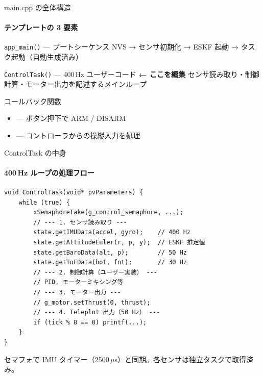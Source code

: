 \documentclass[aspectratio=169, 14pt]{beamer}
\begin{document}
\begin{frame}{main.cpp の全体構造}
  \framesubtitle{テンプレートの 3 要素}

  \begin{block}{\texttt{app\_main()} — ブートシーケンス}
    {\small NVS → センサ初期化 → ESKF 起動 → タスク起動（自動生成済み）}
  \end{block}

  \vspace{0.3em}

  \begin{alertblock}{\texttt{ControlTask()} — 400\,Hz ユーザーコード \textbf{← ここを編集}}
    {\small センサ読み取り・制御計算・モーター出力を記述するメインループ}
  \end{alertblock}

  \vspace{0.3em}

  \begin{exampleblock}{コールバック関数}
    {\small
    \begin{itemize}
      \item {} — ボタン押下で ARM / DISARM
      \item {} — コントローラからの操縦入力を処理
    \end{itemize}
    }
  \end{exampleblock}
\end{frame}

\begin{frame}[fragile]{ControlTask の中身}
  \framesubtitle{400\,Hz ループの処理フロー}
  \begin{lstlisting}[style=sfcpp, basicstyle=\ttfamily\scriptsize]
void ControlTask(void* pvParameters) {
    while (true) {
        xSemaphoreTake(g_control_semaphore, ...);
        // --- 1. センサ読み取り ---
        state.getIMUData(accel, gyro);    // 400 Hz
        state.getAttitudeEuler(r, p, y);  // ESKF 推定値
        state.getBaroData(alt, p);        // 50 Hz
        state.getToFData(bot, fnt);       // 30 Hz
        // --- 2. 制御計算（ユーザー実装） ---
        // PID, モーターミキシング等
        // --- 3. モーター出力 ---
        // g_motor.setThrust(0, thrust);
        // --- 4. Teleplot 出力（50 Hz） ---
        if (tick % 8 == 0) printf(...);
    }
}
  \end{lstlisting}

  {\footnotesize
    セマフォで IMU タイマー（2500\,$\mu$s）と同期。各センサは独立タスクで取得済み。
  }
\end{frame}
\end{document}
